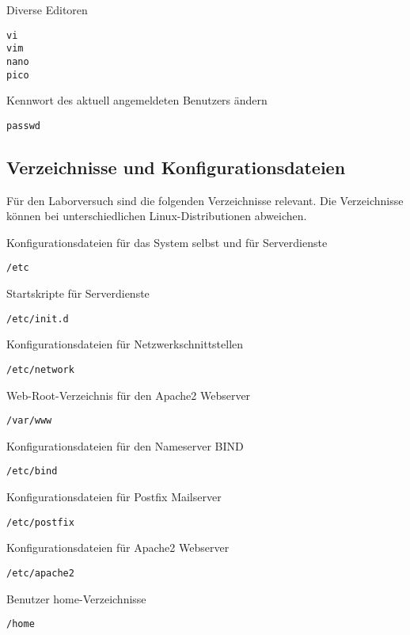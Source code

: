 Diverse Editoren
\begin{lstlisting}
vi
vim
nano
pico
\end{lstlisting}

Kennwort des aktuell angemeldeten Benutzers ändern
\begin{lstlisting}
passwd
\end{lstlisting}

\subsection{Verzeichnisse und Konfigurationsdateien}
Für den Laborversuch sind die folgenden Verzeichnisse relevant. Die
Verzeichnisse können bei unterschiedlichen Linux-Distributionen abweichen.

Konfigurationsdateien für das System selbst und für Serverdienste
\begin{lstlisting}
/etc
\end{lstlisting}

Startskripte für Serverdienste
\begin{lstlisting}
/etc/init.d
\end{lstlisting}

Konfigurationsdateien für Netzwerkschnittstellen\label{ref:appendix_interfaces}
\begin{lstlisting}
/etc/network
\end{lstlisting}

Web-Root-Verzeichnis für den Apache2 Webserver
\begin{lstlisting}
/var/www
\end{lstlisting}

Konfigurationsdateien für den Nameserver BIND
\begin{lstlisting}
/etc/bind
\end{lstlisting}

Konfigurationsdateien für Postfix Mailserver
\begin{lstlisting}
/etc/postfix
\end{lstlisting}

Konfigurationsdateien für Apache2 Webserver
\begin{lstlisting}
/etc/apache2
\end{lstlisting}

Benutzer home-Verzeichnisse
\begin{lstlisting}
/home
\end{lstlisting}

